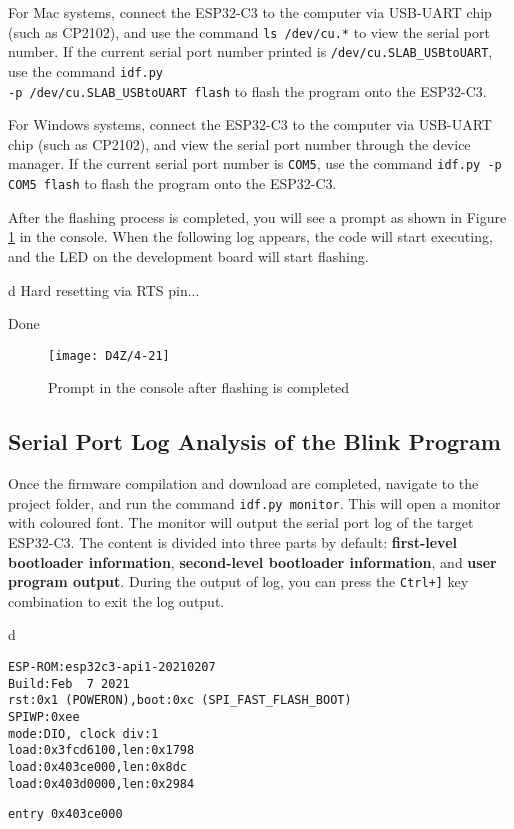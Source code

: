 \documentclass[a4paper,12pt]{book}
\begin{document}
For Mac systems, connect the ESP32-C3 to the computer via USB-UART chip (such as CP2102), and use the command \verb|ls /dev/cu.*| to view the serial port number. If the current serial port number printed is \verb|/dev/cu.SLAB_USBtoUART|, use the command \verb|idf.py |\\ \verb|-p /dev/cu.SLAB_USBtoUART flash| to flash the program onto the ESP32-C3.

For Windows systems, connect the ESP32-C3 to the computer via USB-UART chip (such as CP2102), and view the serial port number through the device manager. If the current serial port number is \verb|COM5|, use the command \verb|idf.py -p COM5 flash| to flash the program onto the ESP32-C3.

After the flashing process is completed, you will see a prompt as shown in Figure \ref{Prompt in the console after flashing is completed} in the console. When the following log appears, the code will start executing, and the LED on the development board will start flashing.

\begin{codebloc}
\begin{tabular}{d}
Hard resetting via RTS pin...

Done
\end{tabular}
\end{codebloc}

\begin{figure}[h!]
    \Centering
    \texttt{[image: D4Z/4-21]}
    \caption{Prompt in the console after flashing is completed}
    \label{Prompt in the console after flashing is completed}
\end{figure}

\subsection{Serial Port Log Analysis of the Blink Program}
Once the firmware compilation and download are completed, navigate to the project folder, and run the command \verb|idf.py monitor|. This will open a monitor with coloured font. The monitor will output the serial port log of the target ESP32-C3. The content is divided into three parts by default: \textbf{first-level bootloader information}, \textbf{second-level bootloader information}, and \textbf{user program output}. During the output of log, you can press the \verb|Ctrl+]| key combination to exit the log output.

\begin{codebloc}
\begin{tabular}{d}
\vspace{2pt}
\begin{verbatim}
ESP-ROM:esp32c3-api1-20210207
Build:Feb  7 2021
rst:0x1 (POWERON),boot:0xc (SPI_FAST_FLASH_BOOT)
SPIWP:0xee
mode:DIO, clock div:1
load:0x3fcd6100,len:0x1798
load:0x403ce000,len:0x8dc
load:0x403d0000,len:0x2984
\end{verbatim}
\verb|entry 0x403ce000|
\end{tabular}
\end{codebloc}
\end{document}
